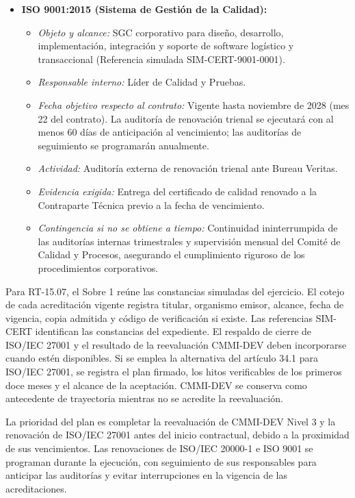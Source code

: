 \begin{itemize}
\begin{itemize}
    \end{itemize}
    \item \textbf{ISO 9001:2015 (Sistema de Gestión de la Calidad):}
    \begin{itemize}
        \item \textit{Objeto y alcance:} SGC corporativo para diseño, desarrollo, implementación, integración y soporte de software logístico y transaccional (Referencia simulada SIM-CERT-9001-0001).
        \item \textit{Responsable interno:} Líder de Calidad y Pruebas.
        \item \textit{Fecha objetivo respecto al contrato:} Vigente hasta noviembre de 2028 (mes 22 del contrato). La auditoría de renovación trienal se ejecutará con al menos 60 días de anticipación al vencimiento; las auditorías de seguimiento se programarán anualmente.
        \item \textit{Actividad:} Auditoría externa de renovación trienal ante Bureau Veritas.
        \item \textit{Evidencia exigida:} Entrega del certificado de calidad renovado a la Contraparte Técnica previo a la fecha de vencimiento.
        \item \textit{Contingencia si no se obtiene a tiempo:} Continuidad ininterrumpida de las auditorías internas trimestrales y supervisión mensual del Comité de Calidad y Procesos, asegurando el cumplimiento riguroso de los procedimientos corporativos.
    \end{itemize}
\end{itemize}

Para RT-15.07, el Sobre 1 reúne las constancias simuladas del ejercicio. El cotejo de cada acreditación vigente registra titular, organismo emisor, alcance, fecha de vigencia, copia admitida y código de verificación si existe. Las referencias SIM-CERT identifican las constancias del expediente. El respaldo de cierre de ISO/IEC 27001 y el resultado de la reevaluación CMMI-DEV deben incorporarse cuando estén disponibles. Si se emplea la alternativa del artículo 34.1 para ISO/IEC 27001, se registra el plan firmado, los hitos verificables de los primeros doce meses y el alcance de la aceptación. CMMI-DEV se conserva como antecedente de trayectoria mientras no se acredite la reevaluación.

La prioridad del plan es completar la reevaluación de CMMI-DEV Nivel 3 y la renovación de ISO/IEC 27001 antes del inicio contractual, debido a la proximidad de sus vencimientos. Las renovaciones de ISO/IEC 20000-1 e ISO 9001 se programan durante la ejecución, con seguimiento de sus responsables para anticipar las auditorías y evitar interrupciones en la vigencia de las acreditaciones.

